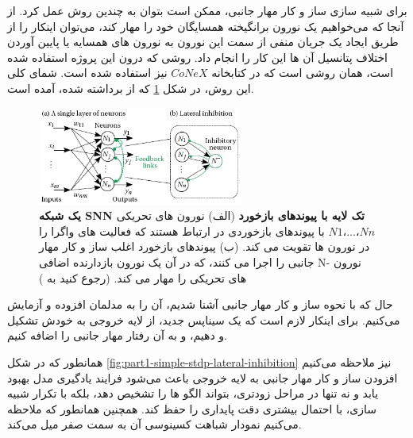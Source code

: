     برای شبیه سازی ساز و کار مهار جانبی، ممکن است بتوان به چندین روش عمل کرد. از آنجا که می‌خواهیم یک نورون برانگیخته همسایگان خود را مهار کند، می‌توان اینکار را از طریق ایجاد یک جریان منفی از سمت این نورون به نورون های همسایه یا پایین آوردن اختلاف پتانسیل آن ها این کار را انجام داد. روشی که درون این پروژه استفاده شده است، همان روشی است که در کتابخانه 
    $CoNeX$ 
    نیز استفاده شده است. شمای کلی این روش، در شکل 
    \ref{fig:lateral-inhibition-scheme}
    که از 
    \cite{Unsupervised-Learning-Lateral-Inhibition} 
    برداشته شده، آمده است.
    \begin{figure}[!ht]
        \centering
        \includegraphics[width=0.6\textwidth]{images/lateral_inhibition_scheme.png} 
        \captionsetup{width=.8\linewidth}
        \caption{\textbf{یک شبکه SNN
        تک لایه با پیوندهای بازخورد }
        (الف)
        نورون های تحریکی 
        $N1، . . . ، Nn$ 
        با پیوندهای بازخوردی در ارتباط هستند که فعالیت های واگرا را در نورون ها تقویت می کند. 
        (ب) 
        پیوندهای بازخورد اغلب ساز و کار مهار جانبی را اجرا می کنند، که در آن یک نورون بازدارنده اضافی 
        N- 
        نورون های تحریکی را مهار می کند. 
        (رجوع کنید به \cite{Unsupervised-Learning-Lateral-Inhibition})}
        \label{fig:lateral-inhibition-scheme}
    \end{figure}

    حال که با نحوه ساز و کار مهار جانبی آشنا شدیم، آن را به مدلمان افزوده و آزمایش می‌کنیم. برای اینکار لازم است که یک سیناپس جدید، از لایه خروجی به خودش تشکیل و دهیم، و به آن رفتار مهار جانبی را اضافه کنیم. 
    
    همانطور که در شکل 
    \ref{fig:part1-simple-stdp-lateral-inhibition} 
    نیز ملاحظه می‌کنیم افزودن ساز و کار مهار جانبی به لایه خروجی باعث می‌شود فرایند یادگیری مدل بهبود یابد و نه تنها در مراحل زودتری، بتواند الگو ها را تشخیص دهد، بلکه با تکرار شبیه سازی، با احتمال بیشتری دقت پایداری را حفظ کند. همچنین همانطور که ملاحظه می‌کنیم نمودار شباهت کسینوسی آن به سمت صفر میل می‌کند.


